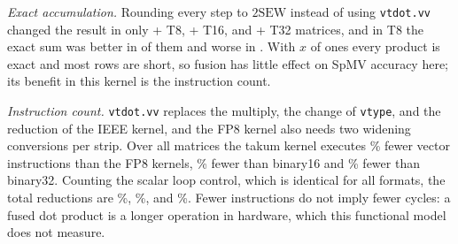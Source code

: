 \documentclass[conference]{IEEEtran}
\newcommand{\code}[1]{\texttt{#1}}
\begin{document}
\emph{Exact accumulation.} Rounding every step to $2\mathrm{SEW}$ instead of
using \code{vtdot.vv} changed the result in only
\the\numexpr\BenchBetterTEightTEightStep+\BenchWorseTEightTEightStep\relax{} T8,
\the\numexpr\BenchBetterTSixteenTSixteenStep+\BenchWorseTSixteenTSixteenStep\relax{} T16,
and \the\numexpr\BenchBetterTThirtyTwoTThirtyTwoStep+\BenchWorseTThirtyTwoTThirtyTwoStep\relax{}
T32 matrices, and in T8 the exact sum was better in
\BenchBetterTEightTEightStep{} of them and worse in
\BenchWorseTEightTEightStep. With $x$ of ones every product is exact and most
rows are short, so fusion has little effect on SpMV accuracy here; its benefit
in this kernel is the instruction count.

\emph{Instruction count.} \code{vtdot.vv} replaces the multiply, the change of
\code{vtype}, and the reduction of the IEEE kernel, and the FP8 kernel also needs
two widening conversions per strip. Over all matrices the takum kernel executes
\BenchVecReductionEFourMThree\% fewer vector instructions than the FP8 kernels,
\BenchVecReductionFPSixteen\% fewer than binary16 and
\BenchVecReductionFPThirtyTwo\% fewer than binary32. Counting the scalar loop
control, which is identical for all formats, the total reductions are
\BenchTotalReductionEFourMThree\%, \BenchTotalReductionFPSixteen\%, and
\BenchTotalReductionFPThirtyTwo\%. Fewer instructions do not imply fewer cycles:
a fused dot product is a longer operation in hardware, which this functional
model does not measure.
\end{document}

